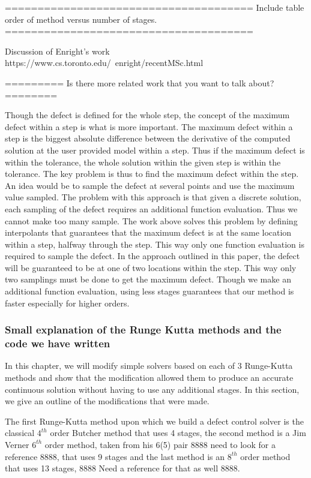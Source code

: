 \documentclass{article}
\begin{document}
======================================
Include table order of method versus number of stages.
======================================

Discussion of Enright's work
https://www.cs.toronto.edu/~enright/recentMSc.html

=========
Is there more related work that you want to talk about?
========

Though the defect is defined for the whole step, the concept of the maximum defect within a step is what is more important. The maximum defect within a step is the biggest absolute difference between the derivative of the computed solution at the user provided model within a step. Thus if the maximum defect is within the tolerance, the whole solution within the given step is within the tolerance. The key problem is thus to find the maximum defect within the step. An idea would be to sample the defect at several points and use the maximum value sampled. The problem with this approach is that given a discrete solution, each sampling of the defect requires an additional function evaluation. Thus we cannot make too many sample. The work above solves this problem by defining interpolants that guarantees that the maximum defect is at the same location within a step, halfway through the step. This way only one function evaluation is required to sample the defect. In the approach outlined in this paper, the defect will be guaranteed to be at one of two locations within the step. This way only two samplings must be done to get the maximum defect. Though we make an additional function evaluation, using less stages guarantees that our method is faster especially for higher orders.


\subsubsection{Small explanation of the Runge Kutta methods and the code we have written}
\label{section:basic_runge_kutta}
In this chapter, we will modify simple solvers based on each of 3 Runge-Kutta methods and show that the modification allowed them to produce an accurate continuous solution without having to use any additional stages. In this section, we give an outline of the modifications that were made.

The first Runge-Kutta method upon which we build a defect control solver is the classical $4^{th}$ order Butcher method that uses 4 stages, the second method is a Jim Verner $6^{th}$ order method, taken from his 6(5) pair 8888 need to look for a reference 8888, that uses 9 stages and the last method is an $8^{th}$ order method that uses 13 stages, 8888 Need a reference for that as well 8888. 
\end{document}

